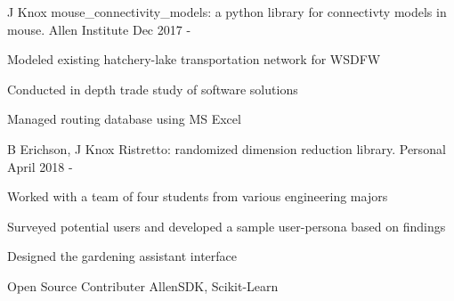 


\begin{cventries}

  \cventry
    {J Knox} %
    {mouse\_connectivity\_models: a python library for connectivty models in mouse.} %
    {Allen Institute} %
    {Dec 2017 -} %
    {
      \begin{cvitems} %
        \item {Modeled existing hatchery-lake transportation network for WSDFW}
        \item {Conducted in depth trade study of software solutions}
        \item {Managed routing database using MS Excel}
      \end{cvitems}
    }

  \cventry
    {B Erichson, J Knox} %
    {Ristretto: randomized dimension reduction library.} %
    {Personal} %
    {April 2018 -} %
    {
      \begin{cvitems} %
        \item {Worked with a team of four students from various engineering majors}
        \item {Surveyed potential users and developed a sample user-persona based on findings}
        \item {Designed the gardening assistant interface}
      \end{cvitems}
    }

\end{cventries}


\begin{cvskills}

  \cvskill
    {Open Source Contributer}
    {AllenSDK, Scikit-Learn}


\end{cvskills}
